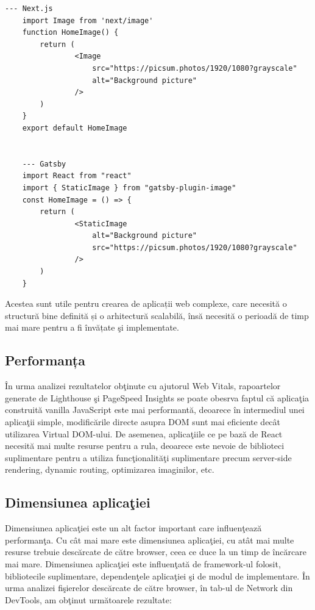 \documentclass[12pt, a4paper]{report}
\begin{document}
\begin{lstlisting}[caption={Exemplu de utilizare a unei imagini optimizate automat \^in Next.js \c si Gatsby},captionpos=b]
	--- Next.js
	import Image from 'next/image'
	function HomeImage() {
		return (
				<Image
					src="https://picsum.photos/1920/1080?grayscale"
					alt="Background picture"
				/>
		)
	}
	export default HomeImage

	
	--- Gatsby
	import React from "react"
	import { StaticImage } from "gatsby-plugin-image"
	const HomeImage = () => {
		return (
				<StaticImage
					alt="Background picture"
					src="https://picsum.photos/1920/1080?grayscale"
				/>
		)
	}
\end{lstlisting} \label{fig:image-optimization}

Acestea sunt utile pentru crearea de aplicații web complexe, care necesită o structură bine definită și o arhitectură scalabilă, \^ins\u a necesit\u a o perioad\u a de timp mai mare pentru a fi \^inv\u ațate \c si implementate.


\subsection{Performanța}

\^In urma analizei rezultatelor ob\c tinute cu ajutorul Web Vitals, rapoartelor generate de Lighthouse \c si PageSpeed Insights se poate obesrva faptul c\u a aplica\c tia construit\u a vanilla JavaScript este mai performant\u a, deoarece \^in intermediul unei aplica\c tii simple, modific\u arile directe asupra DOM sunt mai eficiente dec\^at utilizarea Virtual DOM-ului. De asemenea, aplica\c tiile ce pe baz\u a de React necesit\u a mai multe resurse pentru a rula, deoarece este nevoie de biblioteci suplimentare pentru a utiliza func\c tionalit\u a\c ti suplimentare precum server-side rendering, dynamic routing, optimizarea imaginilor, etc.

\subsection{Dimensiunea aplica\c tiei}

Dimensiunea aplica\c tiei este un alt factor important care influen\c teaz\u a performan\c ta. Cu c\^ at mai mare este dimensiunea aplica\c tiei, cu at\^ at mai multe resurse trebuie desc\u arcate de c\u atre browser, ceea ce duce la un timp de \^ inc\u arcare mai mare. Dimensiunea aplica\c tiei este influen\c tat\u a de framework-ul folosit, bibliotecile suplimentare, dependen\c tele aplica\c tiei \c si de modul de implementare.
\^In urma analizei fi\c sierelor desc\u arcate de c\u atre browser, \^in tab-ul de Network din DevTools, am ob\c tinut urm\u atoarele rezultate:
\end{document}
